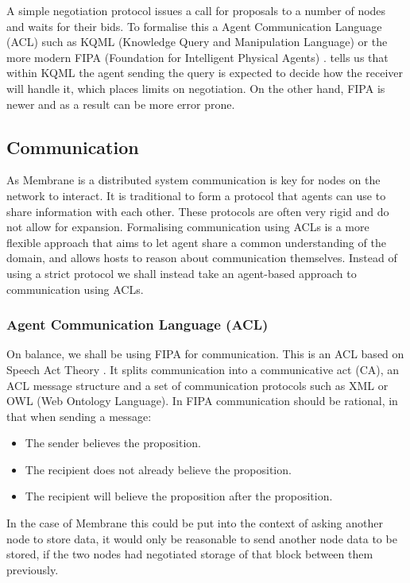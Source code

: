 \documentclass[a4paper,11pt, twocolumn]{report}
\begin{document}
A simple negotiation protocol issues a call for proposals to a number of nodes and waits for their bids. To formalise this a Agent Communication Language (ACL) such as KQML (Knowledge Query and Manipulation Language) \citep{finin1992specification} or the more modern FIPA (Foundation for Intelligent Physical Agents) \citep{fipa2002fipa}. \cite{beer1999negotiation} tells us that within KQML the agent sending the query is expected to decide how the receiver will handle it, which places limits on negotiation. On the other hand, FIPA is newer and as a result can be more error prone.


\subsection{Communication}

As Membrane is a distributed system communication is key for nodes on the network to interact. It is traditional to form a protocol that agents can use to share information with each other. These protocols are often very rigid and do not allow for expansion. Formalising communication using ACLs is a more flexible approach that aims to let agent share a common understanding of the domain, and allows hosts to reason about communication themselves. Instead of using a strict protocol we shall instead take an agent-based approach to communication using ACLs.

\subsubsection{Agent Communication Language (ACL)}

On balance, we shall be using FIPA for communication. This is an ACL based on Speech Act Theory \citep{labrou1999agent}. It splits communication into a communicative act (CA), an ACL message structure and a set of communication protocols such as XML or OWL (Web Ontology Language). In FIPA communication should be rational, in that when sending a message:
\begin{itemize}
  \item The sender believes the proposition.
  \item The recipient does not already believe the proposition.
  \item The recipient will believe the proposition after the proposition.
\end{itemize}
In the case of Membrane this could be put into the context of asking another node to store data, it would only be reasonable to send another node data to be stored, if the two nodes had negotiated storage of that block between them previously.
\end{document}
